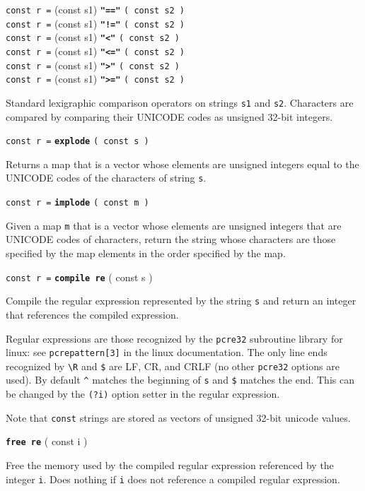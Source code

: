 \documentclass[12pt]{article}
\newcommand{\ttkey}[1]{{\tt \bfseries #1}}
\newenvironment{indpar}[1][0.3in]%
	{\begin{list}{}%
		     {\setlength{\itemsep}{0in}%
		      \setlength{\topsep}{0in}%
		      \setlength{\parsep}{1ex}%
		      \setlength{\labelwidth}{#1}%
		      \setlength{\leftmargin}{#1}%
		      \addtolength{\leftmargin}{\labelsep}}%
	 \item}%
	{\end{list}}
\begin{document}
{\tt const r =} (const s1) \ttkey{"=="} {\tt ( const s2 )} \\
{\tt const r =} (const s1) \ttkey{"!="} {\tt ( const s2 )} \\
{\tt const r =} (const s1) \ttkey{"<"} {\tt ( const s2 )} \\
{\tt const r =} (const s1) \ttkey{"<="} {\tt ( const s2 )} \\
{\tt const r =} (const s1) \ttkey{">"} {\tt ( const s2 )} \\
{\tt const r =} (const s1) \ttkey{">="} {\tt ( const s2 )}
\begin{indpar}
Standard lexigraphic comparison operators on strings {\tt s1} and {\tt s2}.
Characters are compared by comparing their UNICODE codes as unsigned
32-bit integers.
\end{indpar}

{\tt const r =} \ttkey{explode} {\tt ( const s )}
\begin{indpar}
Returns a map that is a vector whose elements are unsigned integers equal
to the UNICODE codes of the characters of string {\tt s}.
\end{indpar}

{\tt const r =} \ttkey{implode} {\tt ( const m )}
\begin{indpar}
Given a map {\tt m} that is a vector whose elements are unsigned integers
that are UNICODE codes of characters, return the string whose characters
are those specified by the map elements in the order specified by the map.
\end{indpar}

{\tt const r =} \ttkey{compile re} ( const s )
\begin{indpar}
Compile the regular expression represented by the string {\tt s}
and return an integer that references the compiled expression.

Regular expressions are those recognized by the {\tt pcre32}
subroutine library for linux: see {\tt pcrepattern[3]} in
the linux documentation.  The only line ends recognized
by {\tt \textbackslash R} and {\tt \$} are LF, CR, and CRLF (no other
{\tt pcre32} options are used).  By default {\tt \textasciicircum}
matches the beginning of {\tt s} and {\tt \$} matches the end.
This can be changed by the {\tt (?i)} option setter in the
regular expression.

Note that {\tt const} strings are stored as vectors of
unsigned 32-bit unicode values.
\end{indpar}

\ttkey{free re} ( const i )
\begin{indpar}
Free the memory used by the compiled regular expression
referenced by the integer {\tt i}.  Does nothing if {\tt i}
does not reference a compiled regular expression.
\end{indpar}
\end{document}
